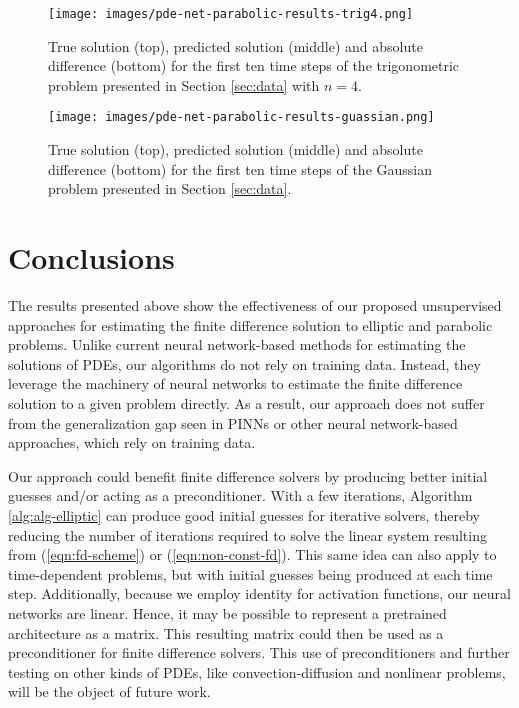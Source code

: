 \documentclass[preprint,12pt]{elsarticle}
\begin{document}
\begin{figure}[ht!]
    \centering
    \texttt{[image: images/pde-net-parabolic-results-trig4.png]}
    \caption{True solution (top), predicted solution (middle) and absolute difference (bottom) for the first ten time steps of the trigonometric problem presented in Section \ref{sec:data} with $n=4$.}
    \label{fig:parabolic-trig-4}
\end{figure}

\begin{figure}[ht!]
    \centering
    \texttt{[image: images/pde-net-parabolic-results-guassian.png]}
    \caption{True solution (top), predicted solution (middle) and absolute difference (bottom) for the first ten time steps of the Gaussian problem presented in Section \ref{sec:data}.}
    \label{fig:parabolic-gaussian}
\end{figure}

\section{Conclusions}
The results presented above show the effectiveness of our proposed unsupervised approaches for estimating the finite difference solution to elliptic and parabolic problems. Unlike current neural network-based methods for estimating the solutions of PDEs, our algorithms do not rely on training data. Instead, they leverage the machinery of neural networks to estimate the finite difference solution to a given problem directly. As a result, our approach does not suffer from the generalization gap seen in PINNs or other neural network-based approaches, which rely on training data. 

Our approach could benefit finite difference solvers by producing better initial guesses and/or acting as a preconditioner. With a few iterations, Algorithm \ref{alg:alg-elliptic} can produce good initial guesses for iterative solvers, thereby reducing the number of iterations required to solve the linear system resulting from (\ref{eqn:fd-scheme}) or (\ref{eqn:non-const-fd}). This same idea can also apply to time-dependent problems, but with initial guesses being produced at each time step. Additionally, because we employ identity for activation functions, our neural networks are linear. Hence, it may be possible to represent a pretrained architecture as a matrix. This resulting matrix could then be used as a preconditioner for finite difference solvers. This use of preconditioners and further testing on other kinds of PDEs, like convection-diffusion and nonlinear problems, will be the object of future work. 
\end{document}
